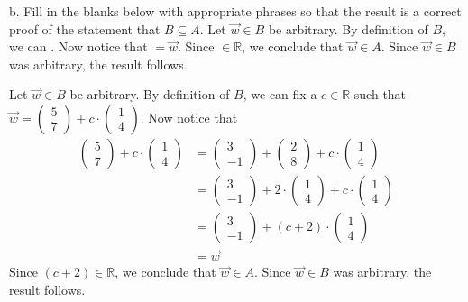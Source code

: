 \documentclass[12pt]{article}
\newenvironment{problem}[2][Problem]
{
	\begin{trivlist} 
		\item[\hskip \labelsep {\bfseries #1 #2:}]
	}
{
	\end{trivlist}
	}
\newenvironment{solution}[1][Solution]
{
	\begin{trivlist} 
		\item[\hskip \labelsep {\itshape #1:}]
	}
	{
	\end{trivlist}
}
\begin{document}
\begin{problem}{4}
\noindent
b. Fill in the blanks below with appropriate phrases so that the result is a correct proof of the statement that $B \subseteq A$.
\newline
\newline
Let $\vec{w} \in B$ be arbitrary. By definition of $B$, we can \underline{\hspace{2cm}}. Now notice that \underline{\hspace{2cm}}$=\vec{w}$. Since \underline{\hspace{2cm}}$\in \mathbb{R}$, we conclude that $\vec{w} \in A$. Since $\vec{w} \in B$ was arbitrary, the result follows.

\begin{solution}
Let $\vec{w} \in B$ be arbitrary. By definition of $B$, we can fix a $c \in \mathbb{R}$ such that $\vec{w}= \begin{pmatrix} 5 \\ 7 \end{pmatrix} + c \cdot \begin{pmatrix} 1 \\ 4 \end{pmatrix}$. Now notice that 
\begin{align*}
\begin{pmatrix} 5 \\ 7 \end{pmatrix} + c \cdot \begin{pmatrix} 1 \\ 4 \end{pmatrix} &=  \begin{pmatrix} 3 \\ -1 \end{pmatrix} + \begin{pmatrix} 2 \\ 8 \end{pmatrix}  + c \cdot \begin{pmatrix} 1 \\ 4 \end{pmatrix}\\
&=\begin{pmatrix} 3 \\ -1 \end{pmatrix} + 2\cdot \begin{pmatrix} 1 \\ 4 \end{pmatrix}  + c \cdot \begin{pmatrix} 1 \\ 4 \end{pmatrix} \\
&= \begin{pmatrix} 3 \\ -1 \end{pmatrix} + (c+2) \cdot \begin{pmatrix} 1 \\ 4 \end{pmatrix}\\
&=\vec{w}
\end{align*}
Since $(c+2) \in \mathbb{R}$, we conclude that $\vec{w} \in A$. Since $\vec{w} \in B$ was arbitrary, the result follows.
\end{solution}


\end{problem}
\end{document}
